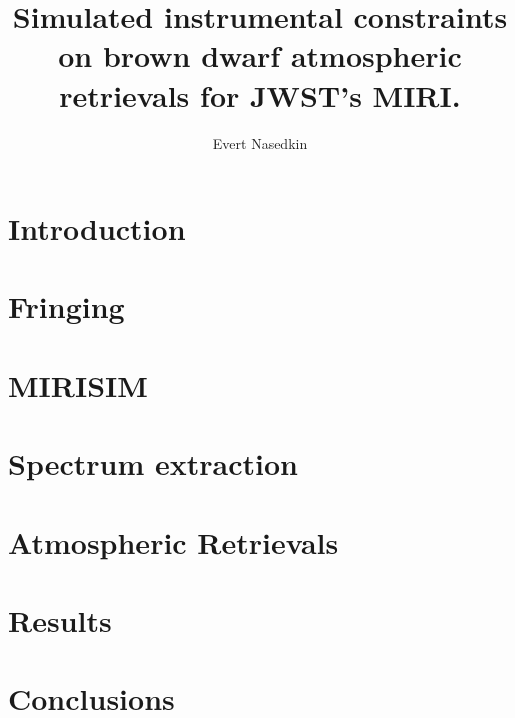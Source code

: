\documentclass[]{article}
\title{Simulated instrumental constraints on brown dwarf atmospheric retrievals for JWST's MIRI.}
\author{Evert Nasedkin}
\begin{document}
\maketitle

\begin{abstract}

\end{abstract}
 
\section{Introduction}
\section{Fringing}
\section{MIRISIM}
\section{Spectrum extraction}
\section{Atmospheric Retrievals}
\section{Results}
\section{Conclusions}



\end{document}
